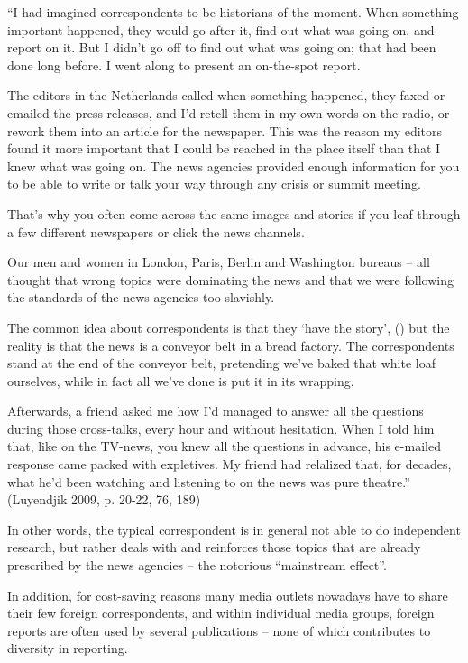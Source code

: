 ``I had imagined correspondents to be historians-of-the-moment. When
something important happened, they would go after it, find out what was
going on, and report on it. But I didn't go off to find out what was
going on; that had been done long before. I went along to present an
on-the-spot report.

The editors in the Netherlands called when something happened, they
faxed or emailed the press releases, and I'd retell them in my own words
on the radio, or rework them into an article for the newspaper. This was
the reason my editors found it more important that I could be reached in
the place itself than that I knew what was going on. The news agencies
provided enough information for you to be able to write or talk your way
through any crisis or summit meeting.

That's why you often come across the same images and stories if you leaf
through a few different newspapers or click the news channels.

Our men and women in London, Paris, Berlin and Washington bureaus -- all
thought that wrong topics were dominating the news and that we were
following the standards of the news agencies too slavishly.

The common idea about correspondents is that they `have the story', ()
but the reality is that the news is a conveyor belt in a bread factory.
The correspondents stand at the end of the conveyor belt, pretending
we've baked that white loaf ourselves, while in fact all we've done is
put it in its wrapping.

Afterwards, a friend asked me how I'd managed to answer all the
questions during those cross-talks, every hour and without hesitation.
When I told him that, like on the TV-news, you knew all the questions in
advance, his e-mailed response came packed with expletives. My friend
had relalized that, for decades, what he'd been watching and listening
to on the news was pure theatre.'' (Luyendjik 2009, p. 20-22, 76, 189)

In other words, the typical correspondent is in general not able to do
independent research, but rather deals with and reinforces those topics
that are already prescribed by the news agencies -- the notorious
``mainstream effect''.

In addition, for cost-saving reasons many media outlets nowadays have to
share their few foreign correspondents, and within individual media
groups, foreign reports are often used by several publications -- none
of which contributes to diversity in reporting.

